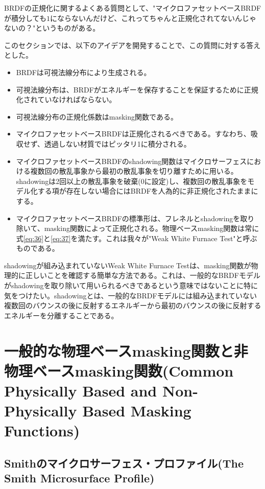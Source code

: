 \documentclass[a4j,xelatex,ja=standard]{bxjsarticle}
\begin{document}
BRDFの正規化に関するよくある質問として、"マイクロファセットベースBRDFが積分しても$1$にならないんだけど、これってちゃんと正規化されてないんじゃないの？"というものがある。

このセクションでは、以下のアイデアを開発することで、この質問に対する答えとした。

\begin{itemize}
\item BRDFは可視法線分布により生成される。
\item 可視法線分布は、BRDFがエネルギーを保存することを保証するために正規化されていなければならない。
\item 可視法線分布の正規化係数はmasking関数である。
\item マイクロファセットベースBRDFは正規化されるべきである。すなわち、吸収せず、透過しない材質ではピッタリ1に積分される。
\item マイクロファセットベースBRDFのshadowing関数はマイクロサーフェスにおける複数回の散乱事象から最初の散乱事象を切り離すために用いる。shadowingは2回以上の散乱事象を破棄(0に設定)し、複数回の散乱事象をモデル化する項が存在しない場合にはBRDFを人為的に非正規化されたままにする。
\item マイクロファセットベースBRDFの標準形は、フレネルとshadowingを取り除いて、masking関数によって正規化される。物理ベースmasking関数は常に式\eqref{eq:36}と\eqref{eq:37}を満たす。これは我々が"Weak White Furnace Test"と呼ぶものである。
\end{itemize}

shadowingが組み込まれていないWeak White Furnace Testは、masking関数が物理的に正しいことを確認する簡単な方法である。これは、一般的なBRDFモデルがshadowingを取り除いて用いられるべきであるという意味ではないことに特に気をつけたい。shadowingとは、一般的なBRDFモデルには組み込まれていない複数回のバウンスの後に反射するエネルギーから最初のバウンスの後に反射するエネルギーを分離することである。

\section{一般的な物理ベースmasking関数と非物理ベースmasking関数(Common Physically Based and Non-Physically Based Masking Functions)}

\subsection{Smithのマイクロサーフェス・プロファイル(The Smith Microsurface Profile)}
\label{sec:4.1}
\end{document}
